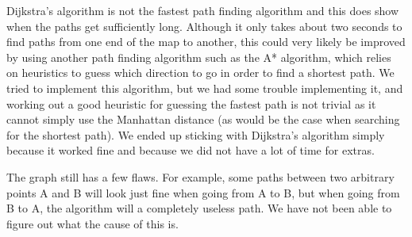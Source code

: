 Dijkstra's algorithm is not the fastest path finding algorithm and this does show when the paths get sufficiently long. Although it only takes about two seconds to find paths from one end of the map to another, this could very likely be improved by using another path finding algorithm such as the A* algorithm, which relies on heuristics to guess which direction to go in order to find a shortest path. We tried to implement this algorithm, but we had some trouble implementing it, and working out a good heuristic for guessing the fastest path is not trivial as it cannot simply use the Manhattan distance (as would be the case when searching for the shortest path). We ended up sticking with Dijkstra's algorithm simply because it worked fine and because we did not have a lot of time for extras.

The graph still has a few flaws. For example, some paths between two arbitrary points A and B will look just fine when going from A to B, but when going from B to A, the algorithm will a completely useless path. We have not been able to figure out what the cause of this is.